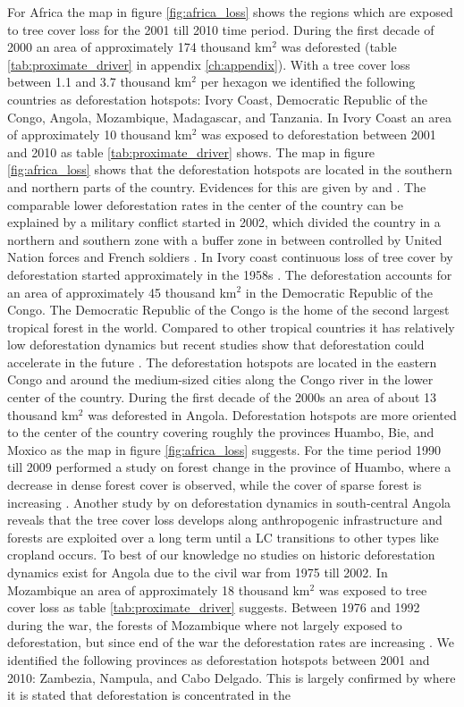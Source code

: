 			For Africa the map in figure \ref{fig:africa_loss} shows the regions which are exposed to tree cover loss for the 2001 till 2010 time period. During the first decade of 2000 an area of approximately 174 thousand km$^2$ was deforested (table \ref{tab:proximate_driver} in appendix \ref{ch:appendix}). With a tree cover loss between 1.1 and 3.7 thousand km$^2$ per hexagon we identified the following countries as deforestation hotspots: Ivory Coast, Democratic Republic of the Congo, Angola, Mozambique, Madagascar, and Tanzania. In Ivory Coast an area of approximately 10 thousand km$^2$ was exposed to deforestation between 2001 and 2010 as table \ref{tab:proximate_driver} shows. The map in figure \ref{fig:africa_loss} shows that the deforestation hotspots are located in the southern and northern parts of the country. Evidences for this are given by \citet{Goetze2006} and \citet{Barima2016}. The comparable lower deforestation rates in the center of the country can be explained by a military conflict started in 2002, which divided the country in a northern and southern zone with a buffer zone in between controlled by United Nation forces and French soldiers \citep{Barima2016}. In Ivory coast continuous loss of tree cover by deforestation started approximately in the 1958s \citep{Chatelain1996}. The deforestation accounts for an area of approximately 45 thousand km$^2$ in the Democratic Republic of the Congo. The Democratic Republic of the Congo is the home of the second largest tropical forest in the world. Compared to other tropical countries it has relatively low deforestation dynamics but recent studies show that deforestation could accelerate in the future \citep{Ickowitz2015}. The deforestation hotspots are located in the eastern Congo and around the medium-sized cities along the Congo river in the lower center of the country. During the first decade of the 2000s an area of about 13 thousand km$^2$ was deforested in Angola. Deforestation hotspots are more oriented to the center of the country covering roughly the provinces Huambo, Bie, and Moxico as the map in figure \ref{fig:africa_loss} suggests. For the time period 1990 till 2009 \citet{Cabral2011} performed a study on forest change in the province of Huambo, where a decrease in dense forest cover is observed, while the cover of sparse forest is increasing \citep{Cabral2011}. Another study by \citet{Schneibel2017} on deforestation dynamics in south-central Angola reveals that the tree cover loss develops along anthropogenic infrastructure and forests are exploited over a long term until a \ac{LC} transitions to other types like cropland occurs. To best of our knowledge no studies on historic deforestation dynamics exist for Angola due to the civil war from 1975 till 2002. In Mozambique an area of approximately 18 thousand km$^2$ was exposed to tree cover loss as table \ref{tab:proximate_driver} suggests. Between 1976 and 1992 during the war, the forests of Mozambique where not largely exposed to deforestation, but since end of the war the deforestation rates are increasing \citep{Sitoe2012}. We identified the following provinces as deforestation hotspots between 2001 and 2010: Zambezia, Nampula, and Cabo Delgado. This is largely confirmed by \citet{Sitoe2012} where it is stated that deforestation is concentrated in the 
